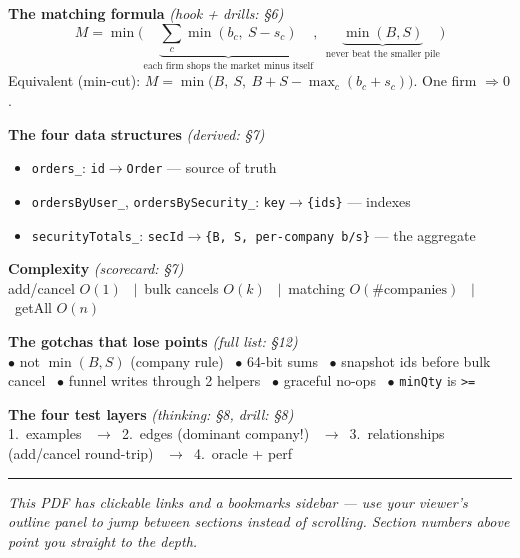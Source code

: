 \documentclass[11pt]{article}
\newcommand{\code}[1]{\texttt{#1}}
\begin{document}
\thispagestyle{empty}
\begin{tcolorbox}[colback=NavyBlue!4,colframe=NavyBlue,boxrule=1.2pt,arc=4pt,
  title={\bfseries Quick reference --- everything at a glance},fonttitle=\large\bfseries\color{white},coltitle=white,colbacktitle=NavyBlue]

\textbf{\color{NavyBlue}The matching formula} \hfill \emph{(hook + drills: \S6)}
\[
M=\min\!\Big(\underbrace{\textstyle\sum_c\min(b_c,\ S-s_c)}_{\text{each firm shops the market minus itself}},\ \ \underbrace{\min(B,S)}_{\text{never beat the smaller pile}}\Big)
\]
Equivalent (min-cut): $M=\min\big(B,\ S,\ B+S-\max_c(b_c+s_c)\big)$. \quad One firm $\Rightarrow 0$.

\medskip
\textbf{\color{NavyBlue}The four data structures} \hfill \emph{(derived: \S7)}
\begin{itemize}[leftmargin=1.3em,nosep]
  \item \code{orders\_}: \code{id$\to$Order} --- source of truth
  \item \code{ordersByUser\_}, \code{ordersBySecurity\_}: \code{key$\to$\{ids\}} --- indexes
  \item \code{securityTotals\_}: \code{secId$\to$\{B,\,S,\,per-company b/s\}} --- the aggregate
\end{itemize}

\medskip
\textbf{\color{NavyBlue}Complexity} \hfill \emph{(scorecard: \S7)}\\
add/cancel $O(1)$ \ $\vert$\ bulk cancels $O(k)$ \ $\vert$\ matching $O(\#\text{companies})$ \ $\vert$\ getAll $O(n)$

\medskip
\textbf{\color{NavyBlue}The gotchas that lose points} \hfill \emph{(full list: \S12)}\\
$\bullet$ not $\min(B,S)$ (company rule) \ $\bullet$ 64-bit sums \ $\bullet$ snapshot ids before bulk cancel \ $\bullet$ funnel writes through 2 helpers \ $\bullet$ graceful no-ops \ $\bullet$ \code{minQty} is \code{>=}

\medskip
\textbf{\color{NavyBlue}The four test layers} \hfill \emph{(thinking: \S8, drill: \S8)}\\
1.\ examples \ $\to$\ 2.\ edges (dominant company!) \ $\to$\ 3.\ relationships (add/cancel round-trip) \ $\to$\ 4.\ oracle + perf

\medskip
\hrule\smallskip
\footnotesize\emph{This PDF has clickable links and a bookmarks sidebar --- use your viewer's
outline panel to jump between sections instead of scrolling. Section numbers above
point you straight to the depth.}
\end{tcolorbox}
\clearpage


\clearpage

\clearpage

\clearpage

\clearpage

\clearpage

\clearpage

\clearpage

\clearpage

\clearpage

\clearpage

\clearpage

\clearpage

\clearpage

\end{document}
